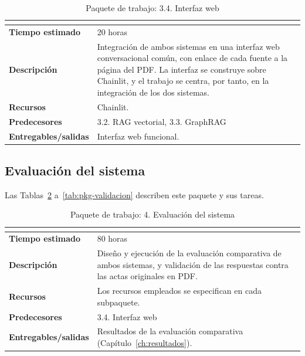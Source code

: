 \documentclass[11pt, a4paper]{report}
\begin{document}
	\begin{table}[H]
		\centering
		\begin{tabularx}{\linewidth}{|>{\bfseries}l|X|}
			\hline
			\rowcolor{pkg-desarrollo}
			\multicolumn{2}{|c|}{\textcolor{white}{\textbf{3.4. Interfaz web}}} \\
			\hline
			Tiempo estimado & 20 horas \\
			\hline
			\rowcolor{fila-alterna}
			Descripción & Integración de ambos sistemas en una interfaz web conversacional común, con enlace de cada fuente a la página del PDF. La interfaz se construye sobre Chainlit, y el trabajo se centra, por tanto, en la integración de los dos sistemas. \\
			\hline
			Recursos & Chainlit. \\
			\hline
			\rowcolor{fila-alterna}
			Predecesores & 3.2. RAG vectorial, 3.3. GraphRAG \\
			\hline
			Entregables/salidas & Interfaz web funcional. \\
			\hline
		\end{tabularx}
		\caption{Paquete de trabajo: 3.4. Interfaz web}
		\label{tab:pkg-interfaz}
	\end{table}

	\subsection{Evaluación del sistema}

	Las Tablas~\ref{tab:pkg-evaluacion} a~\ref{tab:pkg-validacion} describen este paquete y sus tareas.

	\begin{table}[H]
		\centering
		\begin{tabularx}{\linewidth}{|>{\bfseries}l|X|}
			\hline
			\rowcolor{pkg-evaluacion}
			\multicolumn{2}{|c|}{\textcolor{white}{\textbf{4. Evaluación del sistema}}} \\
			\hline
			Tiempo estimado & 80 horas \\
			\hline
			\rowcolor{fila-alterna}
			Descripción & Diseño y ejecución de la evaluación comparativa de
			ambos sistemas, y validación de las respuestas contra las actas
			originales en PDF. \\
			\hline
			Recursos & Los recursos empleados se especifican en cada subpaquete. \\
			\hline
			\rowcolor{fila-alterna}
			Predecesores & 3.4. Interfaz web \\
			\hline
			Entregables/salidas & Resultados de la evaluación comparativa
			(Capítulo~\ref{ch:resultados}). \\
			\hline
		\end{tabularx}
		\caption{Paquete de trabajo: 4. Evaluación del sistema}
		\label{tab:pkg-evaluacion}
	\end{table}
\end{document}
